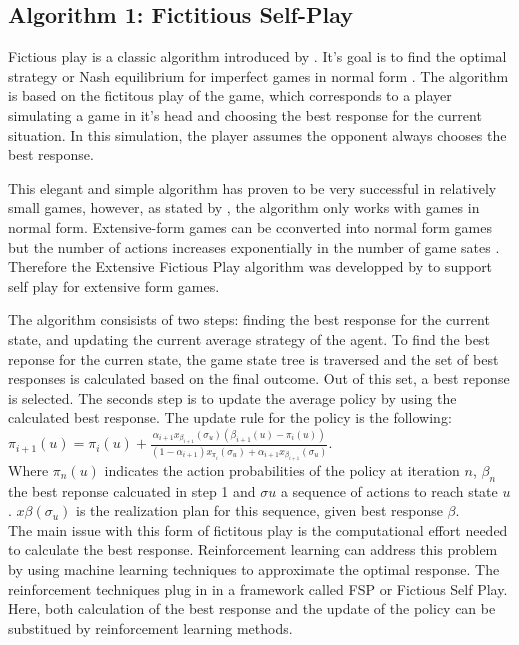 \documentclass[10pt,a4paper]{article}
\begin{document}
\subsection{Algorithm 1: Fictitious Self-Play}
Fictious play is a classic algorithm introduced by \cite{fp}. It's goal is to find the optimal strategy or Nash equilibrium for imperfect games in normal form \cite{MCFSP}. The algorithm is based on the fictitous play of the game, which corresponds to a player simulating a game in it's head and choosing the best response for the current situation. In this simulation, the player assumes the opponent always chooses the best response.

This elegant and simple algorithm has proven to be very successful in relatively small games, however, as stated by \cite{fsp-ext}, the algorithm only works with games in normal form. Extensive-form games can be cconverted into normal form games but the number of actions increases exponentially in the number of game sates \cite{fsp-ext}.
Therefore the Extensive Fictious Play algorithm was developped by \cite{fsp-ext} to support self play for extensive form games.

The algorithm consisists of two steps: finding the best response for the current state, and updating the current average strategy of the agent.
To find the best reponse for the curren state, the game state tree is traversed and the set of best responses is calculated based on the final outcome. Out of this set, a best reponse is selected.
The seconds step is to update the average policy by using the calculated best response. The update rule for the policy is the following:
\begin{math}
\pi_{i+1}(u) = \pi_{i}(u) + \frac{\alpha_{i+1}x_{\beta_{i+1}}(\sigma_{u})(\beta_{i+1}(u) - \pi_i(u))}{(1-\alpha_{i+1})x_{\pi_i}(\sigma_{u}) + \alpha_{i+1}x_{\beta_{i+1}}(\sigma_u)}
\end{math}.\\
Where $\pi_n(u)$ indicates the action probabilities of the policy at iteration $n$, $\beta_n$ the best reponse calcuated in step 1 and $\sigma{u}$ a sequence of actions to reach state $u$. $x{\beta}(\sigma_u)$ is the realization plan for this sequence, given best response $\beta$.\\
The main issue with this form of fictitous play is the computational effort needed to calculate the best response. 
Reinforcement learning can address this problem by using machine learning techniques to approximate the optimal response.
The reinforcement techniques plug in in a framework called FSP or Fictious Self Play. Here, both calculation of the best response and the update of the policy can be substitued by reinforcement learning methods.
\end{document}
